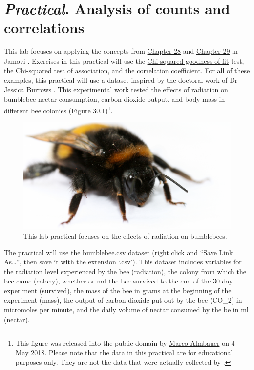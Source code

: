 \documentclass[
]{scrbook}
\begin{document}
\hypertarget{Chapter_30}{%
\chapter{\texorpdfstring{\emph{Practical}. Analysis of counts and correlations}{Practical. Analysis of counts and correlations}}\label{Chapter_30}}

This lab focuses on applying the concepts from \protect\hyperlink{Chapter_28}{Chapter 28} and \protect\hyperlink{Chapter_29}{Chapter 29} in Jamovi \citep{Jamovi2022}.
Exercises in this practical will use the \protect\hyperlink{chi-squared-goodness-of-fit}{Chi-squared goodness of fit} test, the \protect\hyperlink{chi-squared-test-of-association}{Chi-squared test of association},
and the \protect\hyperlink{correlation-hypothesis-testing}{correlation coefficient}.
For all of these examples, this practical will use a dataset inspired by the doctoral work of Dr Jessica Burrows \citep{Burrows2022}.
This experimental work tested the effects of radiation on bumblebee nectar consumption, carbon dioxide output, and body mass in different bee colonies (Figure 30.1)\footnote{This figure was released into the public domain by \href{https://commons.wikimedia.org/wiki/File:Erdhummel_im_Detail.jpg}{Marco Almbauer} on 4 May 2018. Please note that the data in this practical are for educational purposes only. They are not the data that were actually collected by \citet{Burrows2022}.}.

\begin{figure}
\includegraphics[width=0.6\linewidth]{img/bumblebee} \caption{This lab practical focuses on the effects of radiation on bumblebees.}\label{fig:unnamed-chunk-150}
\end{figure}

The practical will use the \href{https://raw.githubusercontent.com/bradduthie/SCIU4T4/main/data/bumblebee.csv}{bumblebee.csv} dataset (right click and ``Save Link As\ldots{}'', then save it with the extension `.csv').
This dataset includes variables for the radiation level experienced by the bee (radiation), the colony from which the bee came (colony), whether or not the bee survived to the end of the 30 day experiment (survived), the mass of the bee in grams at the beginning of the experiment (mass), the output of carbon dioxide put out by the bee (CO\_2) in micromoles per minute, and the daily volume of nectar consumed by the be in ml (nectar).
\end{document}
